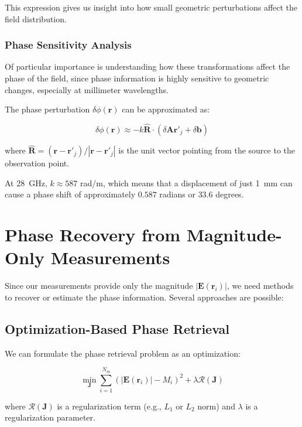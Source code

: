 \documentclass[12pt,a4paper]{article}
\begin{document}
This expression gives us insight into how small geometric perturbations affect the field distribution.

\subsubsection{Phase Sensitivity Analysis}

Of particular importance is understanding how these transformations affect the phase of the field, since phase information is highly sensitive to geometric changes, especially at millimeter wavelengths.

The phase perturbation $\delta\phi(\mathbf{r})$ can be approximated as:

\begin{equation}
    \delta\phi(\mathbf{r}) \approx -k \hat{\mathbf{R}} \cdot (\delta\mathbf{A}\mathbf{r}'_j + \delta\mathbf{b})
\end{equation}

where $\hat{\mathbf{R}} = (\mathbf{r} - \mathbf{r}'_j)/|\mathbf{r} - \mathbf{r}'_j|$ is the unit vector pointing from the source to the observation point.

At \SI{28}{\giga\hertz}, $k \approx 587$ rad/m, which means that a displacement of just \SI{1}{\milli\meter} can cause a phase shift of approximately $0.587$ radians or $33.6$ degrees.

\section{Phase Recovery from Magnitude-Only Measurements}

Since our measurements provide only the magnitude $|\mathbf{E}(\mathbf{r}_i)|$, we need methods to recover or estimate the phase information. Several approaches are possible:

\subsection{Optimization-Based Phase Retrieval}

We can formulate the phase retrieval problem as an optimization:

\begin{equation}
    \min_{\mathbf{J}} \sum_{i=1}^{N_m} \left( |\mathbf{E}(\mathbf{r}_i)| - M_i \right)^2 + \lambda \mathcal{R}(\mathbf{J})
\end{equation}

where $\mathcal{R}(\mathbf{J})$ is a regularization term (e.g., $L_1$ or $L_2$ norm) and $\lambda$ is a regularization parameter.
\end{document}
